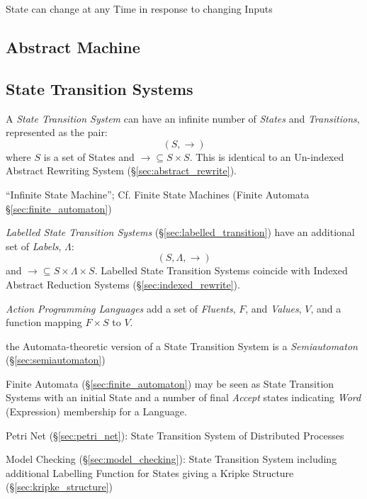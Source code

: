 State can change at any Time in response to changing Inputs



\subsection{Abstract Machine} \label{sec:abstract_machine}

\subsection{State Transition Systems}\label{sec:state_transition}

A \emph{State Transition System} can have an infinite number of
\emph{States} and \emph{Transitions}, represented as the pair:
\[
  (S,\rightarrow)
\]
where $S$ is a set of States and $\rightarrow \subseteq S \times S$.
This is identical to an Un-indexed Abstract Rewriting System
(\S\ref{sec:abstract_rewrite}).

``Infinite State Machine''; \fist Cf. Finite State Machines (Finite
Automata \S\ref{sec:finite_automaton})

\emph{Labelled State Transition Systems}
(\S\ref{sec:labelled_transition}) have an additional set of
\emph{Labels}, $\Lambda$:
\[
  (S,\Lambda,\rightarrow)
\]
and $\rightarrow \subseteq S \times \Lambda \times S$. Labelled State
Transition Systems coincide with Indexed Abstract Reduction Systems
(\S\ref{sec:indexed_rewrite}).

\emph{Action Programming Languages} add a set of \emph{Fluents}, $F$, and
\emph{Values}, $V$, and a function mapping $F \times S$ to $V$.

the Automata-theoretic version of a State Transition System is a
\emph{Semiautomaton} (\S\ref{sec:semiautomaton})

Finite Automata (\S\ref{sec:finite_automaton}) may be seen as State
Transition Systems with an initial State and a number of final
\emph{Accept} states indicating \emph{Word} (Expression) membership
for a Language.

Petri Net (\S\ref{sec:petri_net}): State Transition System of
Distributed Processes

Model Checking (\S\ref{sec:model_checking}): State Transition System
including additional Labelling Function for States giving a Kripke
Structure (\S\ref{sec:kripke_structure})


